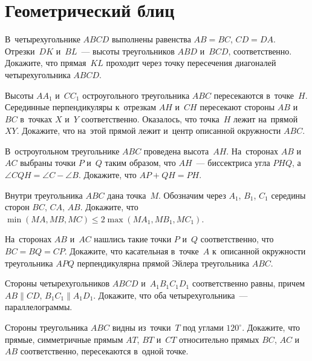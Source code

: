 
\section*{Геометрический блиц}


\begin{problems}

\item
В~четырехугольнике $ABCD$ выполнены равенства $AB = BC$, $CD = DA$.
Отрезки~$DK$ и~$BL$~--- высоты треугольников $ABD$ и~$BCD$, соответственно.
Докажите, что прямая~$KL$ проходит через точку пересечения диагоналей
четырехугольника $ABCD$.

\item
Высоты $A A_1$ и~$C C_1$ остроугольного треугольника $ABC$ пересекаются
в~точке~$H$.
Серединные перпендикуляры к~отрезкам $AH$ и~$CH$ пересекают стороны
$AB$ и~$BC$ в~точках $X$ и~$Y$ соответственно.
Оказалось, что точка~$H$ лежит на~прямой~$XY$.
Докажите, что на~этой прямой лежит и~центр описанной окружности $ABC$.

\item
В~остроугольном треугольнике $ABC$ проведена высота~$AH$.
На~сторонах $AB$ и~$AC$ выбраны точки $P$ и~$Q$ таким образом, что $AH$~---
биссектриса угла $PHQ$, а~$\angle CQH = \angle C - \angle B$.
Докажите, что $AP + QH = PH$.

\item
Внутри треугольника $ABC$ дана точка~$M$.
Обозначим через $A_1$, $B_1$, $C_1$ середины сторон $BC$, $CA$, $AB$.
Докажите, что
\(
    \min(MA, MB, MC)
\leq
    2 \max(M A_1, M B_1, M C_1)
\).

\item
На~сторонах $AB$ и~$AC$ нашлись такие точки $P$ и~$Q$ соответственно, что
$BC = BQ = CP$.
Докажите, что касательная в~точке~$A$ к~описанной окружности треугольника $APQ$
перпендикулярна прямой Эйлера треугольника $ABC$.

\item
Стороны четырехугольников $ABCD$ и~$A_1 B_1 C_1 D_1$ соответственно равны,
причем $AB \parallel CD$, $B_1 C_1 \parallel A_1 D_1$.
Докажите, что оба четырехугольника~--- параллелограммы.

\item
Стороны треугольника $ABC$ видны из~точки~$T$ под углами $120^{\circ}$.
Докажите, что прямые, симметричные прямым $AT$, $BT$ и~$CT$ относительно прямых
$BC$, $AC$ и~$AB$ соответственно, пересекаются в~одной точке.


\end{problems}
